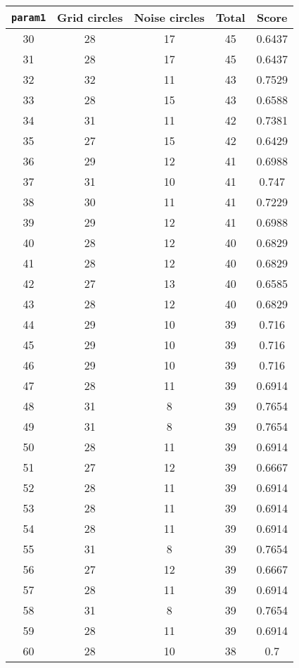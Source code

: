 \documentclass[letterpaper, 12pt]{article}
\begin{document}
\begin{longtable}{|c|c|c|c|c|}
\hline
\textbf{\texttt{param1}} & \textbf{Grid circles} & \textbf{Noise circles} & \textbf{Total} & \textbf{Score} \\
\hline
30 & 28 & 17 & 45 & 0.6437 \\
\hline
31 & 28 & 17 & 45 & 0.6437 \\
\hline
32 & 32 & 11 & 43 & 0.7529 \\
\hline
33 & 28 & 15 & 43 & 0.6588 \\
\hline
34 & 31 & 11 & 42 & 0.7381 \\
\hline
35 & 27 & 15 & 42 & 0.6429 \\
\hline
36 & 29 & 12 & 41 & 0.6988 \\
\hline
37 & 31 & 10 & 41 & 0.747 \\
\hline
38 & 30 & 11 & 41 & 0.7229 \\
\hline
39 & 29 & 12 & 41 & 0.6988 \\
\hline
40 & 28 & 12 & 40 & 0.6829 \\
\hline
41 & 28 & 12 & 40 & 0.6829 \\
\hline
42 & 27 & 13 & 40 & 0.6585 \\
\hline
43 & 28 & 12 & 40 & 0.6829 \\
\hline
44 & 29 & 10 & 39 & 0.716 \\
\hline
45 & 29 & 10 & 39 & 0.716 \\
\hline
46 & 29 & 10 & 39 & 0.716 \\
\hline
47 & 28 & 11 & 39 & 0.6914 \\
\hline
48 & 31 & 8 & 39 & 0.7654 \\
\hline
49 & 31 & 8 & 39 & 0.7654 \\
\hline
50 & 28 & 11 & 39 & 0.6914 \\
\hline
51 & 27 & 12 & 39 & 0.6667 \\
\hline
52 & 28 & 11 & 39 & 0.6914 \\
\hline
53 & 28 & 11 & 39 & 0.6914 \\
\hline
54 & 28 & 11 & 39 & 0.6914 \\
\hline
55 & 31 & 8 & 39 & 0.7654 \\
\hline
56 & 27 & 12 & 39 & 0.6667 \\
\hline
57 & 28 & 11 & 39 & 0.6914 \\
\hline
58 & 31 & 8 & 39 & 0.7654 \\
\hline
59 & 28 & 11 & 39 & 0.6914 \\
\hline
60 & 28 & 10 & 38 & 0.7 \\

\end{longtable}
\end{document}
